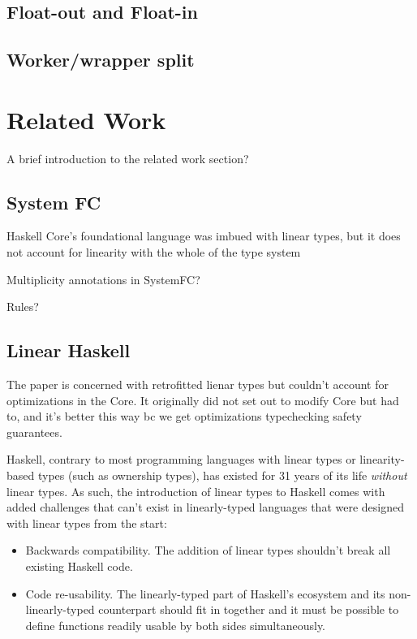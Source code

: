 \documentclass[]{lwnovathesis}
\begin{document}
\subsection{Float-out and Float-in}
\subsection{Worker/wrapper split}

\section{Related Work}

A brief introduction to the related work section?

\subsection{System FC}

Haskell Core's foundational language was imbued with linear types, but it does
not account for linearity with the whole of the type system

Multiplicity annotations in SystemFC?

Rules?

\subsection{Linear Haskell\label{sec:related-work-linear-haskell}}

The paper is concerned with retrofitted lienar types but couldn't account for
optimizations in the Core. It originally did not set out to modify Core but had
to, and it's better this way bc we get optimizations typechecking safety
guarantees.

Haskell, contrary to most programming languages with linear types or
linearity-based types (such as ownership types), has existed for 31 years of its
life \emph{without} linear types. As such, the introduction of linear types to
Haskell comes with added challenges that can't exist in linearly-typed languages
that were designed with linear types from the start:

\begin{itemize}
    \item Backwards compatibility. The addition of linear types shouldn't break
        all existing Haskell code.
    \item Code re-usability. The linearly-typed part of Haskell's ecosystem and
        its non-linearly-typed counterpart should fit in together and it must be
        possible to define functions readily usable by both sides
        simultaneously.
\end{itemize}
\end{document}
